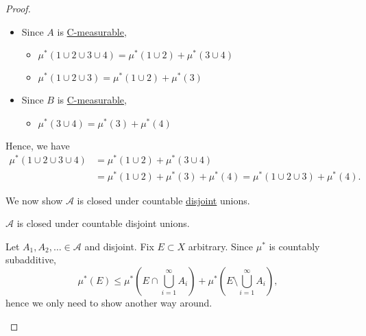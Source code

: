 \begin{proof}
\begin{enumerate}[(1)]
\begin{itemize}
\begin{explanation}
				            \begin{itemize}
					            \item Since \(A\) is \hyperref[def:C-measurable]{C-measurable},
					                  \begin{itemize}
						                  \item \(\mu^{\ast} (1\cup 2\cup 3\cup 4) = \mu^{\ast} (1\cup 2) + \mu^{\ast} (3\cup 4)\)
						                  \item \(\mu^{\ast} (1\cup 2\cup 3) = \mu^{\ast} (1\cup 2) + \mu^{\ast} (3)\)
					                  \end{itemize}
					            \item Since \(B\) is \hyperref[def:C-measurable]{C-measurable},
					                  \begin{itemize}
						                  \item \(\mu^{\ast} (3\cup 4) = \mu^{\ast} (3) + \mu^{\ast} (4)\)
					                  \end{itemize}
				            \end{itemize}
				            Hence, we have
				            \[
					            \begin{split}
						            \mu^{\ast} (1\cup 2\cup 3\cup 4) &= \mu^{\ast} (1\cup 2)+\mu^{\ast} (3\cup 4)\\
						            &= \mu^{\ast} (1\cup 2) + \mu^{\ast} (3) + \mu^{\ast} (4)
						            = \mu^{\ast}(1\cup 2\cup 3) + \mu^{\ast} (4).
					            \end{split}
				            \]
			            \end{explanation}
			            We now show \(\mathcal{A} \) is closed under countable \underline{disjoint} unions.
			            \begin{claim}
				            \(\mathcal{A} \) is closed under countable disjoint unions.
			            \end{claim}
			            \begin{explanation}
				            Let \(A_1, A_2, \dots \in\mathcal{A}\) and disjoint.
				            Fix \(E\subset X\) arbitrary. Since \(\mu^{\ast} \) is countably subadditive,
				            \[
					            \mu^{\ast} (E) \leq  \mu^{\ast} \left(E\cap \bigcup\limits_{i=1}^{\infty} A_{i}\right) + \mu^{\ast} \left(E\setminus \bigcup\limits_{i=1}^{\infty} A_{i}\right),
				            \]
				            hence we only need to show another way around.


\end{explanation}
\end{itemize}
\end{enumerate}
\end{proof}
